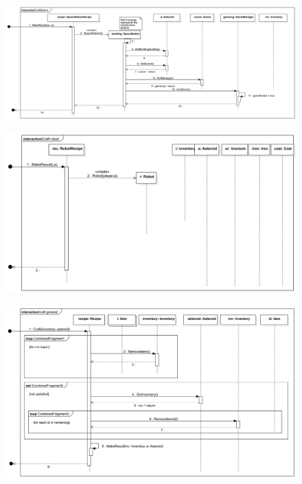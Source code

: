 \begin{figure}[H] 
\centering 
\includegraphics[width=1\textwidth]{docs/3_Project/svg/Design Model!Crafting!CraftStation!CraftStation_21.png} 
\end{figure} 

\begin{figure}[H] 
\centering 
\includegraphics[width=1\textwidth]{docs/3_Project/svg/Design Model!Crafting!Craft robot!Craft robot_22.png} 
\end{figure} 

\begin{figure}[H] 
\centering 
\includegraphics[width=1\textwidth]{docs/3_Project/svg/Design Model!Crafting!Craft general!Craft general_23.png} 
\end{figure} 

